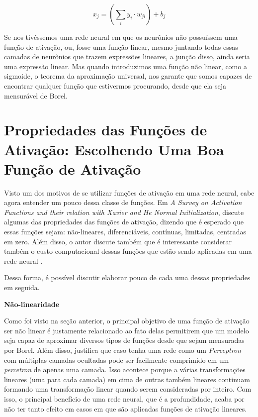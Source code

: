 \[ x_j = (\sum_i y_i \cdot w_{ji}) + b_j \]

Se nos tivéssemos uma rede neural em que os neurônios não possuíssem uma função de ativação, ou, fosse uma função linear, mesmo juntando todas essas camadas de neurônios que trazem expressões lineares, a junção disso, ainda seria uma expressão linear. Mas quando introduzimos uma função não linear, como a sigmoide, o teorema da aproximação universal, nos garante que somos capazes de encontrar qualquer função que estivermos procurando, desde que ela seja mensurável de Borel.

\section{Propriedades das Funções de Ativação: Escolhendo Uma Boa Função de Ativação}

Visto um dos motivos de se utilizar funções de ativação em uma rede neural, cabe agora entender um pouco dessa classe de funções. Em \textit{A Survey on Activation Functions and their relation with Xavier and He Normal Initialization}, \textcite{PropriedadesFuncoesDeAtivacao} discute algumas das propriedades das funções de ativação, dizendo que é esperado que essas funções sejam: não-lineares, diferenciáveis, contínuas, limitadas, centradas em zero. Além disso, o autor discute também que é interessante considerar também o custo computacional dessas funções que estão sendo aplicadas em uma rede neural \parencite{PropriedadesFuncoesDeAtivacao}.

Dessa forma, é possível discutir elaborar pouco de cada uma dessas propriedades em seguida.

\textbf{Não-linearidade}

Como foi visto na seção anterior, o principal objetivo de uma função de ativação ser não linear é justamente relacionado ao fato delas permitirem que um modelo seja capaz de aproximar diversos tipos de funções desde que sejam mensuradas por Borel. Além disso, \textcite{PropriedadesFuncoesDeAtivacao} justifica que caso tenha uma rede como um \textit{Perceptron} com múltiplas camadas ocultadas pode ser facilmente comprimido em um \textit{percetron} de apenas uma camada. Isso acontece porque a várias transformações lineares (uma para cada camada) em cima de outras também lineares continuam formando uma transformação linear quando serem consideradas por inteiro. Com isso, o principal benefício de uma rede neural, que é a profundidade, acaba por não ter tanto efeito em casos em que são aplicadas funções de ativação lineares.

